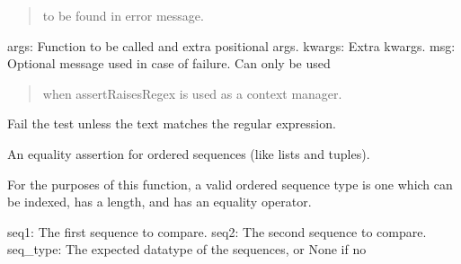 \documentclass[letterpaper,10pt,english]{sphinxmanual}
\begin{document}
\begin{fulllineitems}
\begin{fulllineitems}
\begin{description}
\begin{quote}
\sphinxAtStartPar
to be found in error message.
\end{quote}

\sphinxAtStartPar
args: Function to be called and extra positional args.
kwargs: Extra kwargs.
msg: Optional message used in case of failure. Can only be used
\begin{quote}

\sphinxAtStartPar
when assertRaisesRegex is used as a context manager.
\end{quote}

\end{description}

\end{fulllineitems}


\begin{fulllineitems}
\label{\detokenize{_autosummary/tests.test_unit.test_sqlite:tests.test_unit.test_sqlite.assertRegex}}
\pysigstartsignatures
{}
\pysigstopsignatures
\sphinxAtStartPar
Fail the test unless the text matches the regular expression.

\end{fulllineitems}


\begin{fulllineitems}
\label{\detokenize{_autosummary/tests.test_unit.test_sqlite:tests.test_unit.test_sqlite.assertSequenceEqual}}
\pysigstartsignatures
{}
\pysigstopsignatures
\sphinxAtStartPar
An equality assertion for ordered sequences (like lists and tuples).

\sphinxAtStartPar
For the purposes of this function, a valid ordered sequence type is one
which can be indexed, has a length, and has an equality operator.
\begin{description}
\sphinxAtStartPar
seq1: The first sequence to compare.
seq2: The second sequence to compare.
seq\_type: The expected datatype of the sequences, or None if no
\begin{quote}


\end{quote}
\end{description}
\end{fulllineitems}
\end{fulllineitems}
\end{document}
